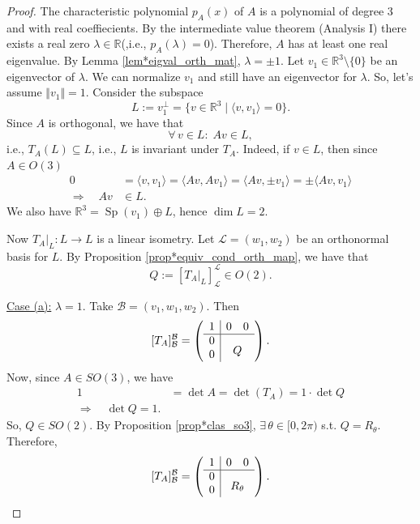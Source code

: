 \begin{proof}
	The characteristic polynomial $p_A(x)$ of $A$ is a polynomial of degree 3 and with real coeffiecients. By the intermediate value theorem (Analysis I) there exists a real zero $\lambda \in \mathbb{R}$(,i.e., $p_A(\lambda) = 0$). Therefore, $A$ has at least one real eigenvalue. By Lemma \ref{lem*eigval_orth_mat}, $\lambda = \pm 1$. Let $v_1 \in \mathbb{R}^3 \setminus \{0\}$ be an eigenvector of $\lambda$. We can normalize $v_1$ and still have an eigenvector for $\lambda$. So, let's assume $\Vert v_1 \Vert = 1$. Consider the subspace
	\[
		L := v_1^{\perp} = \{v \in \mathbb{R}^3 \; |\; \langle v, v_1 \rangle=0 \}.
	\]
	Since $A$ is orthogonal, we have that
	\[
		\forall \, v \in L :\; Av \in L,
	\]
	i.e., $T_A(L) \subseteq L$, i.e., $L$ is invariant under $T_A$. Indeed, if $v \in L$, then since $A \in O(3)$
	\begin{align*}
		0 &= \langle v, v_1 \rangle = \langle Av, Av_1\rangle = \langle Av, \pm v_1\rangle = \pm \langle Av, v_1\rangle\\
		\Longrightarrow \quad Av &\in L.
	\end{align*}
	We also have $\mathbb{R}^3 = \operatorname{Sp}(v_1) \oplus L$, hence $\dim L = 2$.
	
	Now $T_A|_{L}:L \to L$ is a linear isometry. Let $\mathcal{L} = (w_1, w_2)$ be an orthonormal basis for $L$. By Proposition \ref{prop*equiv_cond_orth_map}, we have that
	\[
		Q := [T_A|_{L}]^{\mathcal{L}}_{\mathcal{L}} \in O(2).
	\]
	
	\underline{Case (a):} $\lambda = 1$. Take $\mathcal{B} = (v_1, w_1, w_2)$. Then
	\[
		[T_A]^{\mathcal{B}}_{\mathcal{B}} = 
		\left(
		\begin{array}{c|cc}
			1 & 0 & 0 \\
			\hline
			0 & \multicolumn{2}{c}{\smash{\lower2ex\hbox{$Q$}}} \\
			0 & & 
		\end{array}
		\right).
	\]
	Now, since $A \in SO(3)$, we have
	\begin{align*}
		1 &= \det A = \det(T_A) = 1 \cdot \det Q\\
		\Longrightarrow \quad \det Q = 1.
	\end{align*}
	So, $Q \in SO(2)$. By Proposition \ref{prop*clas_so3}, $\exists \, \theta \in [0, 2\pi)$ s.t. $Q = R_{\theta}$. Therefore,
	\[
		[T_A]^{\mathcal{B}}_{\mathcal{B}} = 
		\left(
		\begin{array}{c|cc}
			1 & 0 & 0 \\
			\hline
			0 & \multicolumn{2}{c}{\smash{\lower2ex\hbox{$R_\theta$}}} \\
			0 & & 
		\end{array}
		\right).
	\]
	

\end{proof}
